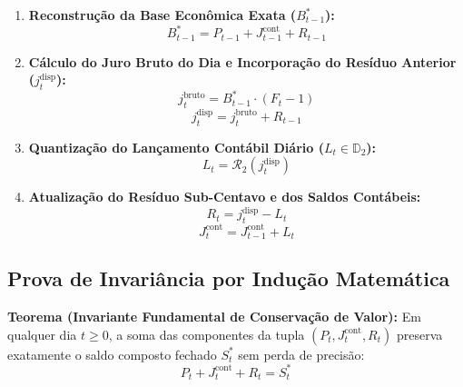 \documentclass[11pt, a4paper]{article}
\begin{document}
\begin{enumerate}
    \item \textbf{Reconstrução da Base Econômica Exata ($B_{t-1}^{*}$):}
    \begin{equation}
        B_{t-1}^{*} = P_{t-1} + J_{t-1}^{\text{cont}} + R_{t-1}
    \end{equation}
    \item \textbf{Cálculo do Juro Bruto do Dia e Incorporação do Resíduo Anterior ($j_t^{\text{disp}}$):}
    \begin{equation}
        j_t^{\text{bruto}} = B_{t-1}^{*} \cdot (F_t - 1)
    \end{equation}
    \begin{equation}
        j_t^{\text{disp}} = j_t^{\text{bruto}} + R_{t-1}
    \end{equation}
    \item \textbf{Quantização do Lançamento Contábil Diário ($L_t \in \mathbb{D}_2$):}
    \begin{equation}
        L_t = \mathcal{R}_2 \left( j_t^{\text{disp}} \right)
    \end{equation}
    \item \textbf{Atualização do Resíduo Sub-Centavo e dos Saldos Contábeis:}
    \begin{equation}
        R_t = j_t^{\text{disp}} - L_t
    \end{equation}
    \begin{equation}
        J_t^{\text{cont}} = J_{t-1}^{\text{cont}} + L_t
    \end{equation}
\end{enumerate}

\subsection{Prova de Invariância por Indução Matemática}

\textbf{Teorema (Invariante Fundamental de Conservação de Valor):} Em qualquer dia $t \ge 0$, a soma das componentes da tupla $(P_t, J_t^{\text{cont}}, R_t)$ preserva exatamente o saldo composto fechado $S_t^{*}$ sem perda de precisão:
\begin{equation}
    P_t + J_t^{\text{cont}} + R_t = S_t^{*}
\end{equation}
\end{document}
